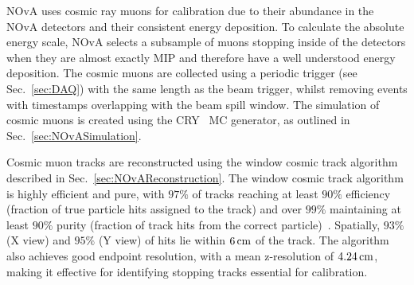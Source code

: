 
\gls{NOvA} uses cosmic ray muons for calibration due to their abundance in the \gls{NOvA} detectors and their consistent energy deposition. To calculate the absolute energy scale, \gls{NOvA} selects a subsample of muons stopping inside of the detectors when they are almost exactly \gls{MIP} and therefore have a well understood energy deposition. The cosmic muons are collected using a periodic trigger (see Sec.~\ref{sec:DAQ}) with the same length as the beam trigger, whilst removing events with timestamps overlapping with the beam spill window. The simulation of cosmic muons is created using the \gls{CRY}~\cite{CRY} \gls{MC} generator, as outlined in Sec.~\ref{sec:NOvASimulation}.


Cosmic muon tracks are reconstructed using the window cosmic track algorithm described in Sec.~\ref{sec:NOvAReconstruction}. The window cosmic track algorithm is highly efficient and pure, with $97\%$ of tracks reaching at least $90\%$ efficiency (fraction of true particle hits assigned to the track) and over $99\%$ maintaining at least $90\%$ purity (fraction of track hits from the correct particle)~\cite{NOvA-doc-15977}. Spatially, $93\%$ (X view) and $95\%$ (Y view) of hits lie within $\unit[6]{cm}$ of the track. The algorithm also achieves good endpoint resolution, with a mean z-resolution of $\unit[4.24]{cm}$, making it effective for identifying stopping tracks essential for calibration.

